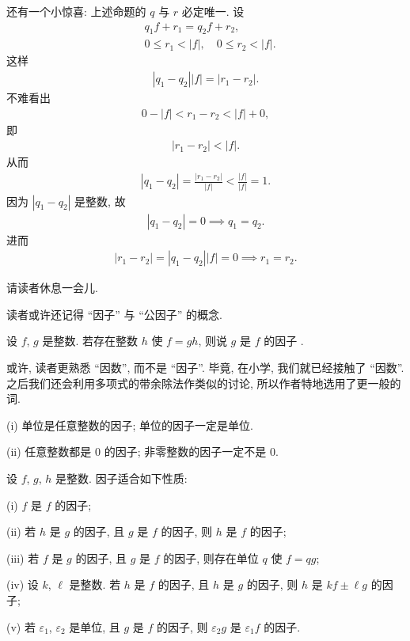 还有一个小惊喜: 上述命题的 $q$ 与 $r$ 必定唯一. 设
\begin{align*}
     & q_1 f + r_1 = q_2 f + r_2,                \\
     & 0 \leq r_1 < |f|, \quad 0 \leq r_2 < |f|.
\end{align*}
这样
\begin{align*}
    |q_1 - q_2| |f| = |r_1 - r_2|.
\end{align*}
不难看出
\begin{align*}
    0 - |f| < r_1 - r_2 < |f| + 0,
\end{align*}
即
\begin{align*}
    |r_1 - r_2| < |f|.
\end{align*}
从而
\begin{align*}
    |q_1 - q_2| = \frac{|r_1 - r_2|}{|f|} < \frac{|f|}{|f|} = 1.
\end{align*}
因为 $|q_1 - q_2|$ 是整数, 故
\begin{align*}
    |q_1 - q_2| = 0 \implies q_1 = q_2.
\end{align*}
进而
\begin{align*}
    |r_1 - r_2| = |q_1 - q_2| |f| = 0 \implies r_1 = r_2.
\end{align*}

请读者休息一会儿.

\myLine

读者或许还记得 ``因子'' 与 ``公因子'' 的概念.
\begin{definition}
    设 $f$, $g$ 是整数. 若存在整数 $h$ 使 $f=gh$, 则说 $g$ 是 $f$ 的因子 .
\end{definition}

\begin{remark}
    或许, 读者更熟悉 ``因数'', 而不是 ``因子''. 毕竟, 在小学, 我们就已经接触了 ``因数''. 之后我们还会利用多项式的带余除法作类似的讨论, 所以作者特地选用了更一般的词.
\end{remark}

\begin{example}
    (i) 单位是任意整数的因子; 单位的因子一定是单位.

    (ii) 任意整数都是 $0$ 的因子; 非零整数的因子一定不是 $0$.
\end{example}

\begin{proposition}
    设 $f$, $g$, $h$ 是整数. 因子适合如下性质:

    (i) $f$ 是 $f$ 的因子;

    (ii) 若 $h$ 是 $g$ 的因子, 且 $g$ 是 $f$ 的因子, 则 $h$ 是 $f$ 的因子;

    (iii) 若 $f$ 是 $g$ 的因子, 且 $g$ 是 $f$ 的因子, 则存在单位 $q$ 使 $f = qg$;

    (iv) 设 $k$, $\ell$ 是整数. 若 $h$ 是 $f$ 的因子, 且 $h$ 是 $g$ 的因子, 则 $h$ 是 $kf \pm \ell g$ 的因子;

    (v) 若 $\varepsilon_1$, $\varepsilon_2$ 是单位, 且 $g$ 是 $f$ 的因子, 则 $\varepsilon_2 g$ 是 $\varepsilon_1 f$ 的因子.
\end{proposition}

